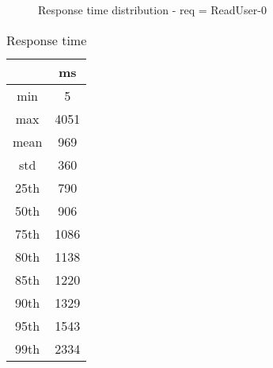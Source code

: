 \begin{minipage}{0.75\linewidth}
\begin{figure}[h]
\begin{adjustbox}{max width=1.0\linewidth, keepaspectratio}
  \end{adjustbox}
  \caption{Response time distribution - req = ReadUser-0}
\end{figure}
\end{minipage}\hfill\begin{minipage}{0.18\linewidth}
\begin{table}[h]
\begin{tabular}{|cc|}
\hline
\textbf{} & \textbf{ms}\\ \hline
 \Xhline{0.005\arrayrulewidth}
min & 5\\
 \Xhline{0.005\arrayrulewidth}
max & 4051\\
 \Xhline{0.005\arrayrulewidth}
mean & 969\\
 \Xhline{0.005\arrayrulewidth}
std & 360\\
\hline
\hline
 \Xhline{0.005\arrayrulewidth}
25th & 790\\
 \Xhline{0.005\arrayrulewidth}
50th & 906\\
 \Xhline{0.005\arrayrulewidth}
75th & 1086\\
 \Xhline{0.005\arrayrulewidth}
80th & 1138\\
 \Xhline{0.005\arrayrulewidth}
85th & 1220\\
 \Xhline{0.005\arrayrulewidth}
90th & 1329\\
 \Xhline{0.005\arrayrulewidth}
95th & 1543\\
 \Xhline{0.005\arrayrulewidth}
99th & 2334\\
\hline
\end{tabular}
\caption{Response time}
\end{table}
\end{minipage}\hfill